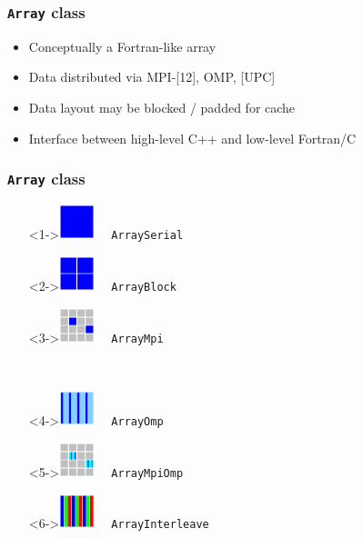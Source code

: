 \documentclass{beamer}
\newcommand{\code}[1]{\texttt{#1}}
\begin{document}
\begin{frame}
\frametitle{\code{Array} class}

\begin{itemize}
\item Conceptually a Fortran-like array
\item Data distributed via MPI-[12], OMP, [UPC]
\item Data layout may be blocked / padded for cache
\item Interface between high-level C++ and low-level Fortran/C
\end{itemize}
\end{frame}
\begin{frame}
\frametitle{\code{Array} class}

\begin{minipage}{1.8in}
\begin{itemize}
\item[]<1->\includegraphics[width=0.4in]{array-serial.png} \ \ \code{ArraySerial}
\item[]<2->\includegraphics[width=0.4in]{array-block.png} \ \ \code{ArrayBlock}
\item[]<3->\includegraphics[width=0.4in]{array-mpi.png} \ \ \code{ArrayMpi}
\end{itemize}
\end{minipage} \ 
\begin{minipage}{2in}
\begin{itemize}
\item[]<4->\includegraphics[width=0.4in]{array-omp.png} \ \ \code{ArrayOmp}
\item[]<5->\includegraphics[width=0.4in]{array-mpi-omp.png} \ \ \code{ArrayMpiOmp}
\item[]<6->\includegraphics[width=0.4in]{array-interleave.png} \ \ \code{ArrayInterleave}
\end{itemize}
\end{minipage}

\end{frame}
\end{document}
